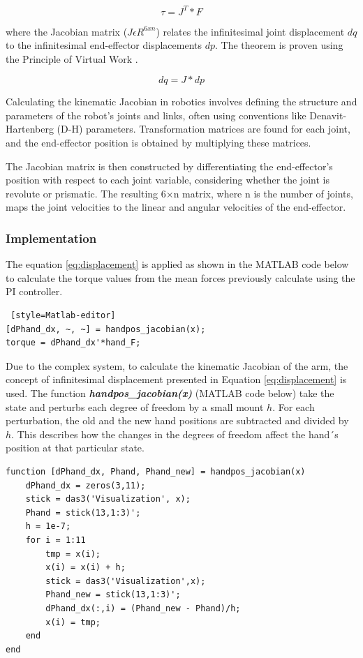 \begin{equation}
    \tau = J^T*F
\end{equation}

where the Jacobian matrix ($J \epsilon R^{6xn}$) relates the infinitesimal joint displacement $dq$ to the infinitesimal end-effector displacements $dp$. The theorem is proven using the Principle of Virtual Work \cite{ITR}.

\begin{equation}\label{eq:displacement}
    dq = J*dp
\end{equation} 

Calculating the kinematic Jacobian in robotics involves defining the structure and parameters of the robot's joints and links, often using conventions like Denavit-Hartenberg (D-H) parameters. Transformation matrices are found for each joint, and the end-effector position is obtained by multiplying these matrices.

The Jacobian matrix is then constructed by differentiating the end-effector's position with respect to each joint variable, considering whether the joint is revolute or prismatic. The resulting 6×n matrix, where n is the number of joints, maps the joint velocities to the linear and angular velocities of the end-effector.

\subsubsection{Implementation}
The equation \ref{eq:displacement} is applied as shown in the MATLAB code below to calculate the torque values from the mean forces previously calculate using the PI controller. 

\begin{lstlisting} [style=Matlab-editor]
[dPhand_dx, ~, ~] = handpos_jacobian(x);
torque = dPhand_dx'*hand_F;
\end{lstlisting}

Due to the complex system, to calculate the kinematic Jacobian of the arm, the concept of infinitesimal displacement presented in Equation \ref{eq:displacement} is used. The function \textbf{\textit{handpos\_jacobian(x)}} (MATLAB code below) take the state and perturbs each degree of freedom by a small mount $h$. For each perturbation, the old and the new hand positions are  subtracted and divided by $h$. This describes how the changes in the degrees of freedom affect the hand´s position at that particular state. 

\begin{lstlisting}[style=Matlab-editor]
function [dPhand_dx, Phand, Phand_new] = handpos_jacobian(x)
    dPhand_dx = zeros(3,11);
    stick = das3('Visualization', x);
    Phand = stick(13,1:3)';
    h = 1e-7;
    for i = 1:11
        tmp = x(i);
        x(i) = x(i) + h;
        stick = das3('Visualization',x);
        Phand_new = stick(13,1:3)';
        dPhand_dx(:,i) = (Phand_new - Phand)/h;
        x(i) = tmp;
    end        
end
\end{lstlisting}

